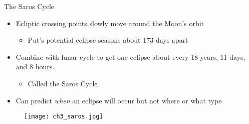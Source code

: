 \documentclass[pdf, aspectratio=169]{beamer}
\begin{document}
\begin{frame}{The Saros Cycle}
  \begin{itemize}
	\item Ecliptic crossing points slowly move around the Moon's orbit
	  \begin{itemize}
		\item Put's potential eclipse seasons about 173 days apart
	  \end{itemize}
	\item Combine with lunar cycle to get one eclipse about every 18 years, 11 days, and 8 hours.
	  \begin{itemize}
		\item Called the \alert{Saros Cycle}
	  \end{itemize}
	\item Can predict \emph{when} an eclipse will occur but not where or what type
  \end{itemize}
  \begin{figure}[h!]
	\centering
	\texttt{[image: ch3\_saros.jpg]}
  \end{figure}
\end{frame}
\end{document}
